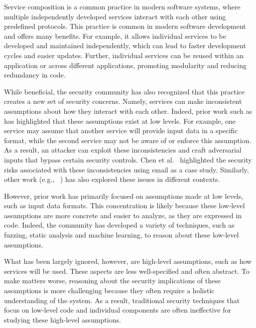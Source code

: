\begin{dissertationintroduction}
Service composition is a common practice in modern software systems, where multiple independently developed services interact with each other using predefined protocols. This practice is common in modern software development and offers many benefits. For example, it allows individual services to be developed and maintained independently, which can lead to faster development cycles and easier updates. Further, individual services can be reused within an application or 
across different applications, promoting modularity and reducing redundancy in code.

While beneficial, the security community has also recognized that this practice creates a new set of security concerns. Namely, services can make inconsistent assumptions about how they interact with each other. Indeed, prior work such as has highlighted that these assumptions exist at low levels. For example, one service may assume that another service will provide input data in a specific format, while the second service may not 
be aware of or enforce this assumption. As a result, an attacker can exploit these inconsistencies and craft adversarial inputs that bypass certain security controls.
Chen et al.~\cite{chen2020composition} highlighted the security risks associated with these inconsistencies
using email as a case study. Similarly, other work (e.g., ~\cite{other2020study}) has also explored these issues in different contexts.


However, prior work has primarily focused on assumptions made at low levels, such as input data formats. This concentration is likely because these low-level assumptions are more concrete and easier to analyze, as they are expressed in code. Indeed, the community has developed a variety of techniques, such as fuzzing, static analysis and machine learning, to reason about these low-level assumptions. 

What has been largely ignored, however, are high-level assumptions, such as how services will be used. These aspects are less well-specified and often abstract. 
To make matters worse, reasoning about the security implications of these assumptions is more challenging because they often require a holistic understanding of the system. As a result, traditional security techniques that focus on low-level code and individual components are often ineffective for studying these high-level assumptions.


\end{dissertationintroduction}

